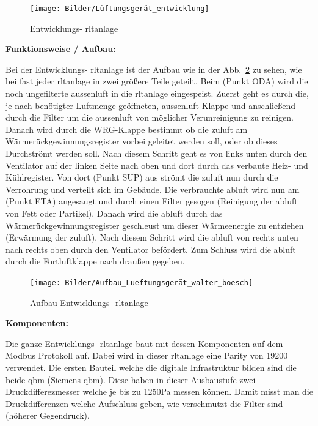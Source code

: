 \begin{figure}[H]
	\centering
	\texttt{[image: Bilder/Lüftungsgerät\_entwicklung]}
	\caption{Entwicklungs- \ac{rltanlage}} 
	\label{fig:LG_entwicklung}
\end{figure}

\textbf{Funktionsweise / Aufbau:}

Bei der Entwicklungs- \ac{rltanlage} ist der Aufbau wie in der Abb.~\ref{fig:Bauplan_entwicklung} zu sehen, wie bei fast jeder \ac{rltanlage} in zwei größere Teile geteilt.
Beim (Punkt ODA) wird die noch ungefilterte \gls{aussenluft} in die \ac{rltanlage} eingespeist. Zuerst geht es durch die, je nach benötigter Luftmenge geöffneten, \gls{aussenluft} Klappe und anschließend durch die Filter um die \gls{aussenluft} von möglicher Verunreinigung zu reinigen. Danach wird durch die WRG-Klappe bestimmt ob die \gls{zuluft} am Wärmerückgewinnungsregister vorbei geleitet werden soll, oder ob dieses Durchströmt werden soll. Nach diesem Schritt geht es von links unten durch den Ventilator auf der linken Seite nach oben und dort durch das verbaute Heiz- und Kühlregister. Von dort (Punkt SUP) aus strömt die \gls{zuluft} nun durch die Verrohrung und verteilt sich im Gebäude. Die verbrauchte \gls{abluft} wird nun am (Punkt ETA) angesaugt und durch einen Filter gesogen (Reinigung der \gls{abluft} von \zB Fett oder Partikel). Danach wird die \gls{abluft} durch das Wärmerückgewinnungsregister geschleust um dieser Wärmeenergie zu entziehen (Erwärmung der \gls{zuluft}). Nach diesem Schritt wird die \gls{abluft} von rechts unten nach rechts oben durch den Ventilator befördert. Zum Schluss wird die \gls{abluft} durch die Fortluftklappe nach draußen gegeben. 

\begin{figure}[H]
	\centering
	\texttt{[image: Bilder/Aufbau\_Lueftungsgerät\_walter\_boesch]}
	\caption{Aufbau Entwicklungs- \ac{rltanlage}} 
	\label{fig:Bauplan_entwicklung}
\end{figure}


\textbf{Komponenten:}

Die ganze Entwicklungs- \ac{rltanlage} baut mit dessen Komponenten auf dem Modbus Protokoll auf. Dabei wird in dieser \ac{rltanlage} eine Parity von 19200 verwendet. Die ersten Bauteil welche die digitale Infrastruktur bilden sind die beide \gls{qbm}  (Siemens \gls{qbm}). Diese haben in dieser Ausbaustufe zwei Druckdifferezmesser welche je bis zu 1250Pa messen können. Damit misst man die Druckdifferenzen welche Aufschluss geben, wie verschmutzt die Filter sind (höherer Gegendruck).

